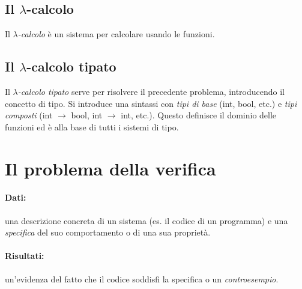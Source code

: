 \subsection{Il \texorpdfstring{$\mathcal{\lambda}$}--calcolo}

Il \textit{$\lambda$-calcolo} è un sistema per calcolare usando le funzioni. 



\subsection{Il \texorpdfstring{$\mathcal{\lambda}$}--calcolo tipato}

Il \textit{$\lambda$-calcolo tipato} serve per risolvere il precedente problema, introducendo il concetto di tipo. Si introduce una sintassi con \textit{tipi di base} (int, bool, etc.) e \textit{tipi composti} (int $\rightarrow$ bool, int $\rightarrow$ int, etc.). Questo definisce il dominio delle funzioni ed è alla base di tutti i sistemi di tipo.

\section{Il problema della verifica}

\paragraph{Dati:} una descrizione concreta di un sistema (es. il codice di un programma) e una \textit{specifica} del suo comportamento o di una sua proprietà.

\paragraph{Risultati:} un'evidenza del fatto che il codice soddisfi la specifica o un \textit{controesempio}.

